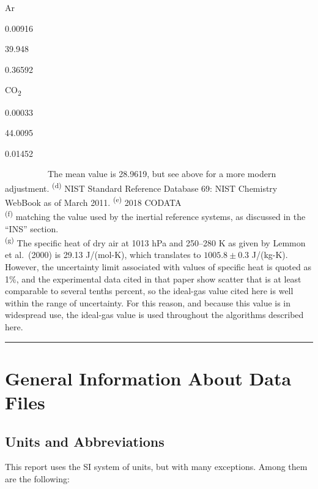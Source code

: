\documentclass[
  english,
]{book}
\begin{document}
Ar

0.00916

39.948

0.36592

CO\textsubscript{2}

0.00033

44.0095

0.01452

~~~~~~~~~~The mean value is 28.9619, but see above for a more modern
adjustment. \textsuperscript{(d)} NIST Standard Reference Database 69:
NIST Chemistry WebBook as of March 2011. \textsuperscript{(e)} 2018
CODATA\\
\textsuperscript{(f)} matching the value used by the inertial reference
systems, as discussed in the ``INS'' section.\\
\textsuperscript{(g)} The specific heat of dry air at 1013 hPa and
250--280 K as given by Lemmon et al.~(2000) is 29.13 J/(mol-K), which
translates to \(1005.8\pm 0.3\) J/(kg-K). However, the uncertainty limit
associated with values of specific heat is quoted as 1\%, and the
experimental data cited in that paper show scatter that is at least
comparable to several tenths percent, so the ideal-gas value cited here
is well within the range of uncertainty. For this reason, and because
this value is in widespread use, the ideal-gas value is used throughout
the algorithms described here.

\begin{center}\rule{0.5\linewidth}{0.5pt}\end{center}

\hypertarget{general-information-about-data-files}{%
\chapter{General Information About Data
Files}\label{general-information-about-data-files}}

\hypertarget{units-and-abbreviations}{%
\section{Units and Abbreviations}\label{units-and-abbreviations}}

This report uses the SI system of units, but with many exceptions. Among
them are the following:
\end{document}

